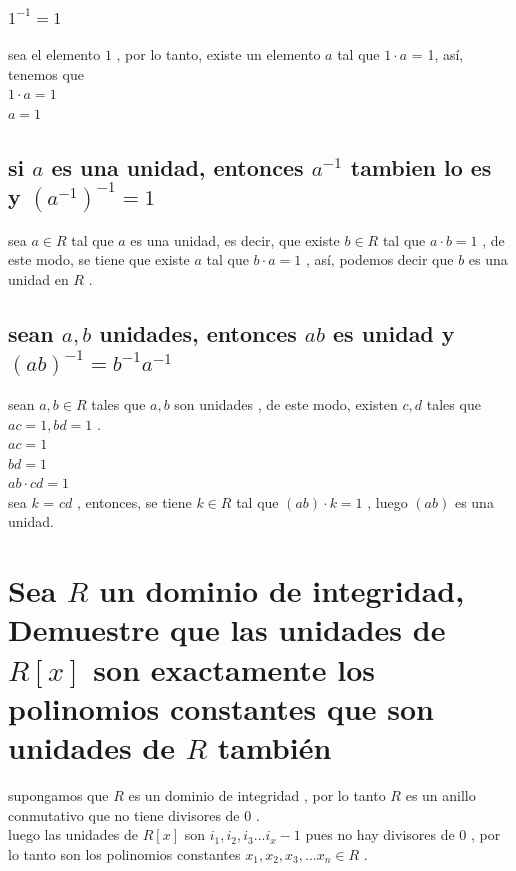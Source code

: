 \documentclass[10pt,a4paper]{article} %
\begin{document}
            \subsubsection{ $ 1 ^{-1} =1  $  }
                sea el elemento $ 1  $ , por lo tanto, existe un elemento $ a
                $ tal que $ 1 \cdot a  $  = 1, así, tenemos que
                \\
                $ 1 \cdot a = 1  $
                \\
                $ a = 1  $


        \subsection{si $ a  $ es una unidad, entonces $ a ^{-1}   $ tambien lo
        es y $ (a ^{-1})^{-1}    = 1  $ }

            sea $ a \in R  $ tal que $ a  $ es una unidad, es decir, que existe
            $ b \in  R  $ tal que $ a \cdot  b = 1  $ , de este modo, se tiene
            que  existe $ a  $ tal que $ b \cdot a = 1  $ , así, podemos decir
            que $ b  $ es una unidad en $ R  $ .

        \subsection{sean $ a,b  $ unidades, entonces $ ab  $ es unidad y $
        (ab)^{-1} = b ^{-1} a ^{-1}   $ }
            sean $ a,b \in R  $ tales que $ a,b  $ son unidades , de este modo,
            existen $ c,d  $ tales que $ ac = 1 , bd = 1  $ .
            \\
            $ ac = 1  $
            \\
            $ bd = 1  $
            \\
            $ ab \cdot cd = 1  $
            \\
            sea $ k  $  = $ cd  $ , entonces, se tiene $ k \in R  $ tal que $
            (ab)\cdot k = 1  $ , luego $ (ab)  $ es una unidad.


        \section{Sea $ R  $ un dominio de integridad, Demuestre que las
        unidades de $ R[x]  $  son exactamente los polinomios constantes
        que son unidades de $ R  $ también}

            supongamos que $ R  $ es un dominio de integridad , por lo tanto $
            R  $ es un anillo conmutativo que no tiene divisores de $ 0  $ .
            \\
            luego las unidades de $ R[x]  $ son $ i_1 , i_2 , i_3 ... i_x-1  $
            pues no hay divisores de $ 0  $ , por lo tanto son los polinomios
            constantes $ x_1 , x_2 , x_3 , ... x_n \in R  $  .
\end{document}
